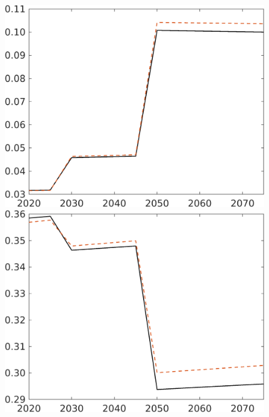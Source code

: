 \begin{figure}[h!!]
\begin{minipage}[]{0.32\textwidth}
	\end{minipage}
	\begin{minipage}[]{0.32\textwidth}
		\includegraphics[width=1\textwidth]{../../codding_model/own_basedOnFried/optimalPol_elastS_DisuSci/figures/all_1705/comp_notaul_OPT_T_NoTaus_sg_spillover0_sep1_BN0_ineq0_etaa0.79.png}
	\end{minipage}
	\begin{minipage}[]{0.32\textwidth}
		\includegraphics[width=1\textwidth]{../../codding_model/own_basedOnFried/optimalPol_elastS_DisuSci/figures/all_1705/comp_notaul_OPT_T_NoTaus_sn_spillover0_sep1_BN0_ineq0_etaa0.79.png}
	\end{minipage}
	

\end{figure}
